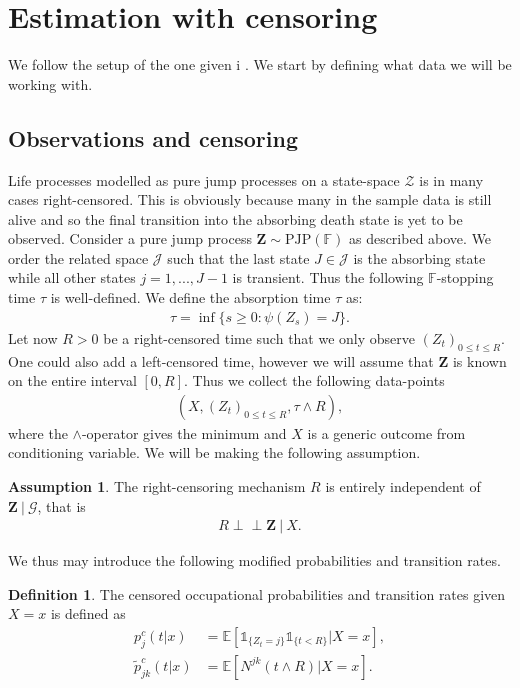 \documentclass[12pt,letter,twoside]{article}
\theoremstyle{plain}
\theoremstyle{definition}
\newtheorem{definition}[theorem]{Definition}
\newtheorem{assumption}{Assumption}
\theoremstyle{remark}
\begin{document}
\section{Estimation with censoring}
We follow the setup of the one given i \cite{furrerbladt2023}. We start by defining what data we will be working with.

\subsection{Observations and censoring}
Life processes modelled as pure jump processes on a state-space $\mathcal Z$ is in many cases right-censored. This is obviously because many in the sample data is still alive and so the final transition into the absorbing death state is yet to be observed. Consider a pure jump process $\mathbf Z\sim\text{PJP}(\mathbb F)$ as described above. We order the related space $\mathcal J$ such that the last state $J\in\mathcal J$ is the absorbing state while all other states $j=1,...,J-1$ is transient. Thus the following $\mathbb F$-stopping time $\tau$ is well-defined. We define the absorption time $\tau$ as:
\begin{align}
\tau = \inf\{s\ge 0 : \psi(Z_s)=J\}.
\end{align}
Let now $R>0$ be a right-censored time such that we only observe $(Z_t)_{0\le t\le R}$. One could also add a left-censored time, however we will assume that $\mathbf Z$ is known on the entire interval $[0,R]$. Thus we collect the following data-points
\begin{align}
(X,(Z_t)_{0\le t\le R},\tau \wedge R),
\end{align}
where the $\wedge$-operator gives the minimum and $X$ is a generic outcome from conditioning variable. We will be making the following assumption.
\begin{assumption}\label{assumption:1}
The right-censoring mechanism $R$ is entirely independent of $\mathbf Z\ \vert\  \mathcal G$, that is
\begin{align}
    R\perp\!\!\!\perp \mathbf Z\ \vert\ X.
\end{align}
\end{assumption}
We thus may introduce the following modified probabilities and transition rates.
\begin{definition}
The censored occupational probabilities and transition rates given $X=x$ is defined as
\begin{align}
p^c_j(t\vert x)&=\mathbb E[\mathds 1_{\{Z_t=j\}}\mathds 1_{\{t< R\}}\vert X=x],\\
\tilde p^c_{jk}(t\vert x)&=\mathbb E[N^{jk}(t\wedge R)\vert X=x].
\end{align}
\end{definition}
\end{document}
